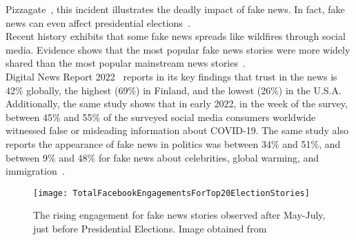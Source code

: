 Pizzagate~\parencite{Pizzagate_Fisher}, this incident illustrates the deadly impact of fake news. In fact, fake news can even affect presidential elections~\parencite{SocialMediaAndFakeNewsIn2016Election_Allcott, TrumpWonBecauseOfFacebook_Read}.\\
Recent history exhibits that some fake news spreads like wildfires through social media. Evidence shows that the most popular fake news stories
were more widely shared than the most popular mainstream news stories~\parencite{Buzzfeed_FakeNewsOutperformRealNews_Silverman}.\\
Digital News Report 2022~\parencite{ReutersInstituteDigitalNewsReport} reports in its key findings that trust in the news is 42\% globally,
the highest (69\%) in Finland, and the lowest (26\%) in the U.S.A. Additionally, the same study shows that in early 2022, in the week of the
survey, between 45\% and 55\% of the surveyed social media consumers worldwide witnessed false or misleading information about COVID-19. The
same study also reports the appearance of fake news in politics was between 34\% and 51\%, and between 9\% and 48\% for fake news about
celebrities, global warming, and immigration~\parencite{StatistaUsageOfSocialMedia_Watson}.
\begin{figure}
    \centering
    \texttt{[image: TotalFacebookEngagementsForTop20ElectionStories]}
    \caption[Total Facebook Engagements for Top 20 Election Stories]{The rising engagement for fake news stories observed after May-July, just before Presidential Elections. Image obtained from~\parencite{Buzzfeed_FakeNewsOutperformRealNews_Silverman}}\label{fig:TotalFacebookEngagementsForTop20ElectionStories}
\end{figure}
